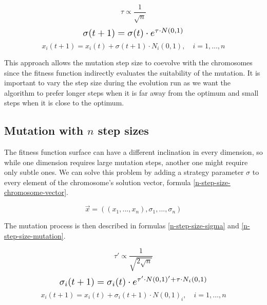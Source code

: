 \begin{equation}
    \tau \propto \frac{1}{\sqrt{n}}
\end{equation}
\begin{equation} \label{single-step-size-sigma} \scalebox{1.3}{
    $\sigma(t+1) = \sigma(t) \cdot e^{\tau \cdot N(0,1)}$
}
\end{equation}
\begin{equation} \label{single-step-size-mutation}
    x_i(t+1) = x_i(t) + \sigma(t+1) \cdot N_i(0,1), \quad i = 1,...,n
\end{equation}

This approach allows the mutation step size to coevolve with the chromosomes since the fitness function indirectly evaluates the suitability of the mutation. It is important to vary the step size during the evolution run as we want the algorithm to prefer longer steps when it is far away from the optimum and small steps when it is close to the optimum.

\subsection{Mutation with $n$ step sizes} \label{n-step}
The fitness function surface can have a different inclination in every dimension, so while one dimension requires large mutation steps, another one might require only subtle ones. We can solve this problem by adding a strategy parameter $\sigma$ to every element of the chromosome's solution vector, formula \ref{n-step-size-chromosome-vector}.

 \begin{equation} \label{n-step-size-chromosome-vector}
    \vec{x} = ((x_1,...,x_n), \sigma_1,...,\sigma_n)
 \end{equation}

The mutation process is then described in formulas \ref{n-step-size-sigma} and \ref{n-step-size-mutation}.

\begin{equation}
\label{tau-prime}
\tau' \propto \frac{1}{\sqrt{2\sqrt{n}}}
\end{equation}
\begin{equation} \label{n-step-size-sigma} \scalebox{1.3}{
    $\sigma_i(t+1) = \sigma_i(t) \cdot e^{\tau' \cdot N(0,1)' + \tau \cdot N_i(0,1)}$
}
\end{equation}
\begin{equation} \label{n-step-size-mutation}
    x_i(t+1) = x_i(t) + \sigma_i(t+1) \cdot N(0,1)_i, \quad i = 1,...,n
\end{equation}

